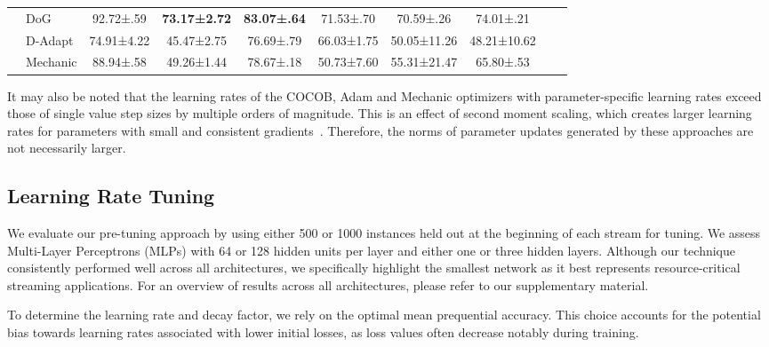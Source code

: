\documentclass{article} %
\begin{document}
\begin{table}[ht]
\begin{tabular}{llcccccccc}
                                                         & DoG \citep{ivgiDoGSGDBest2023}                                                     & 92.72±.59           & \bfseries 73.17±2.72 & \bfseries 83.07±.64   & 71.53±.70            & 70.59±.26           & 74.01±.21           \\
                                                         & D-Adapt                    \citep{defazioLearningRateFreeLearningDAdaptation2023a} & 74.91±4.22          & 45.47±2.75           & 76.69±.79             & 66.03±1.75           & 50.05±11.26         & 48.21±10.62         \\
                                                         & Mechanic \citep{cutkoskyMechanicLearningRate2023}                                  & 88.94±.58           & 49.26±1.44           & 78.67±.18             & 50.73±7.60           & 55.31±21.47         & 65.80±.53           \\
      \bottomrule
   \end{tabular}
   \label{tab:results_adaptive_optims}
\end{table}

It may also be noted that the learning rates of the COCOB, Adam and Mechanic optimizers with parameter-specific learning rates exceed those of single value step sizes by multiple orders of magnitude.
This is an effect of second moment scaling, which creates larger learning rates for parameters with small and consistent gradients~\citep{cutkoskyMechanicLearningRate2023}.
Therefore, the norms of parameter updates generated by these approaches are not necessarily larger.


\subsection{Learning Rate Tuning}

We evaluate our pre-tuning approach by using either 500 or 1000 instances held out at the beginning of each stream for tuning. We assess Multi-Layer Perceptrons (MLPs) with 64 or 128 hidden units per layer and either one or three hidden layers.
Although our technique consistently performed well across all architectures, we specifically highlight the smallest network as it best represents resource-critical streaming applications. For an overview of results across all architectures, please refer to our supplementary material.

To determine the learning rate and decay factor, we rely on the optimal mean prequential accuracy. This choice accounts for the potential bias towards learning rates associated with lower initial losses, as loss values often decrease notably during training.
\end{document}
